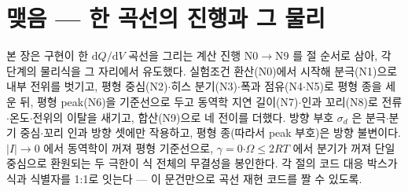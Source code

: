 \documentclass[11pt,a4paper]{article}
\newcommand{\dd}{\mathrm{d}}
\newcommand{\sgn}{\sigma_d}
\begin{document}
\section*{맺음 — 한 곡선의 진행과 그 물리}
본 장은 구현이 한 $\dd Q/\dd V$ 곡선을 그리는 계산 진행 N0$\to$N9 를 절 순서로 삼아, 각 단계의 물리식을 그 자리에서 유도했다. 실험조건 환산(N0)에서 시작해 분극(N1)으로 내부 전위를 벗기고, 평형 중심(N2)$\cdot$히스 분기(N3)$\cdot$폭과 점유(N4$\cdot$N5)로 평형 종을 세운 뒤, 평형 peak(N6)을 기준선으로 두고 동역학 지연 길이(N7)$\cdot$인과 꼬리(N8)로 전류$\cdot$온도$\cdot$전위의 이탈을 새기고, 합산(N9)으로 네 전이를 더했다. 방향 부호 $\sgn$ 은 분극$\cdot$분기 중심$\cdot$꼬리 인과 방향 셋에만 작용하고, 평형 종(따라서 peak 부호)은 방향 불변이다. $|I|\to0$ 에서 동역학이 꺼져 평형 기준선으로, $\gamma=0$$\cdot\Omega\le2RT$ 에서 분기가 꺼져 단일 중심으로 환원되는 두 극한이 식 전체의 무결성을 봉인한다. 각 절의 코드 대응 박스가 식과 식별자를 1:1로 잇는다 — 이 문건만으로 곡선 재현 코드를 짤 수 있도록.
\end{document}

